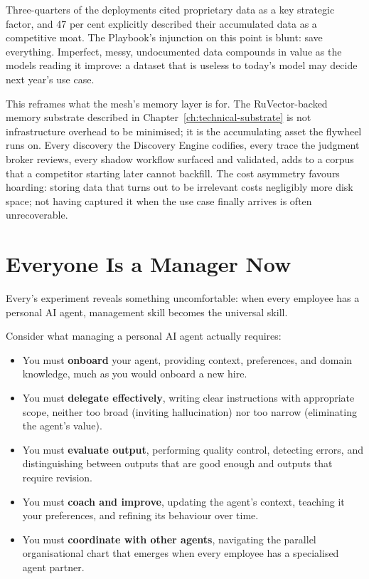 Three-quarters of the deployments cited proprietary data as a key strategic factor, and 47 per cent explicitly described their accumulated data as a competitive moat. The Playbook's injunction on this point is blunt: save everything. Imperfect, messy, undocumented data compounds in value as the models reading it improve: a dataset that is useless to today's model may decide next year's use case.

This reframes what the mesh's memory layer is for. The RuVector-backed memory substrate described in Chapter~\ref{ch:technical-substrate} is not infrastructure overhead to be minimised; it is the accumulating asset the flywheel runs on. Every discovery the Discovery Engine codifies, every trace the judgment broker reviews, every shadow workflow surfaced and validated, adds to a corpus that a competitor starting later cannot backfill. The cost asymmetry favours hoarding: storing data that turns out to be irrelevant costs negligibly more disk space; not having captured it when the use case finally arrives is often unrecoverable.

\section{Everyone Is a Manager Now}

Every's experiment reveals something uncomfortable: when every employee has a personal AI agent, management skill becomes the universal skill.

Consider what managing a personal AI agent actually requires:

\begin{itemize}
  \item You must \textbf{onboard} your agent, providing context, preferences, and domain knowledge, much as you would onboard a new hire.
  \item You must \textbf{delegate effectively}, writing clear instructions with appropriate scope, neither too broad (inviting hallucination) nor too narrow (eliminating the agent's value).
  \item You must \textbf{evaluate output}, performing quality control, detecting errors, and distinguishing between outputs that are good enough and outputs that require revision.
  \item You must \textbf{coach and improve}, updating the agent's context, teaching it your preferences, and refining its behaviour over time.
  \item You must \textbf{coordinate with other agents}, navigating the parallel organisational chart that emerges when every employee has a specialised agent partner.
\end{itemize}

